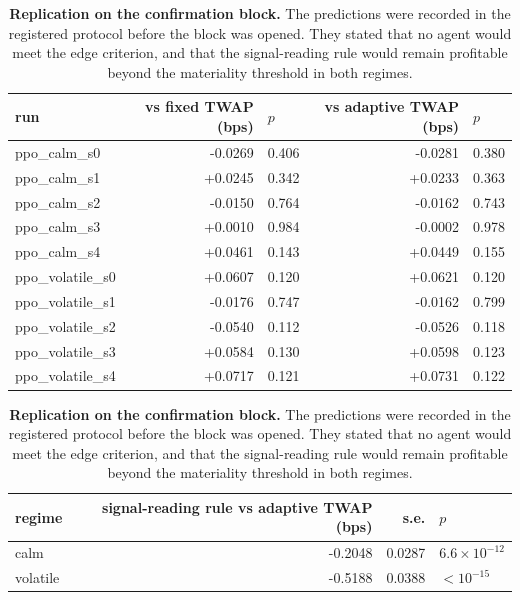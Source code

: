 \begin{table}[htbp]\centering
\caption[Replication on the confirmation block]{\textbf{Replication on the confirmation block.} The predictions were recorded in the registered
protocol before the block was opened. They stated that no agent would meet the edge criterion,
and that the signal-reading rule would remain profitable beyond the materiality threshold in
both regimes.}
\label{tab:sigext-sealed}
\small
\begin{tabular}{lrlrl}
\toprule
run & vs fixed TWAP (bps) & $p$ & vs adaptive TWAP (bps) & $p$ \\
\midrule
ppo\_calm\_s0 & -0.0269 & 0.406 & -0.0281 & 0.380 \\
ppo\_calm\_s1 & +0.0245 & 0.342 & +0.0233 & 0.363 \\
ppo\_calm\_s2 & -0.0150 & 0.764 & -0.0162 & 0.743 \\
ppo\_calm\_s3 & +0.0010 & 0.984 & -0.0002 & 0.978 \\
ppo\_calm\_s4 & +0.0461 & 0.143 & +0.0449 & 0.155 \\
ppo\_volatile\_s0 & +0.0607 & 0.120 & +0.0621 & 0.120 \\
ppo\_volatile\_s1 & -0.0176 & 0.747 & -0.0162 & 0.799 \\
ppo\_volatile\_s2 & -0.0540 & 0.112 & -0.0526 & 0.118 \\
ppo\_volatile\_s3 & +0.0584 & 0.130 & +0.0598 & 0.123 \\
ppo\_volatile\_s4 & +0.0717 & 0.121 & +0.0731 & 0.122 \\
\bottomrule
\end{tabular}

\vspace{0.6em}
\begin{tabular}{lrrl}
\toprule
regime & signal-reading rule vs adaptive TWAP (bps) & s.e. & $p$ \\
\midrule
calm & -0.2048 & 0.0287 & $6.6\times 10^{-12}$ \\
volatile & -0.5188 & 0.0388 & $<10^{-15}$ \\
\bottomrule
\end{tabular}
\end{table}

